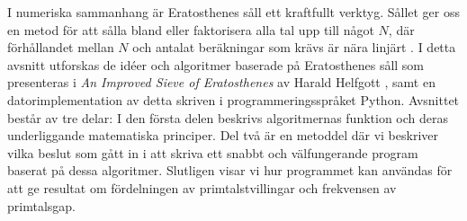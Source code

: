 
I numeriska sammanhang är Eratosthenes såll ett kraftfullt verktyg.
Sållet ger oss en metod för att sålla bland eller faktorisera alla tal upp till något $N$,
där förhållandet mellan $N$ och antalat beräkningar som krävs är nära linjärt \cite[s. 333]{HaraldSieve}.
I detta avsnitt utforskas de idéer och algoritmer baserade på Eratosthenes såll som presenteras i \textit{An Improved Sieve of Eratosthenes} av Harald Helfgott \cite{HaraldSieve}, samt en datorimplementation av detta skriven i programmeringsspråket Python. 
Avsnittet består av tre delar:
I den första delen beskrivs algoritmernas funktion och deras underliggande matematiska principer.
Del två är en metoddel där vi beskriver vilka beslut som gått in i att skriva ett snabbt och välfungerande program baserat på dessa algoritmer.
Slutligen visar vi hur programmet kan användas för att ge resultat om fördelningen av primtalstvillingar och frekvensen av primtalsgap.


